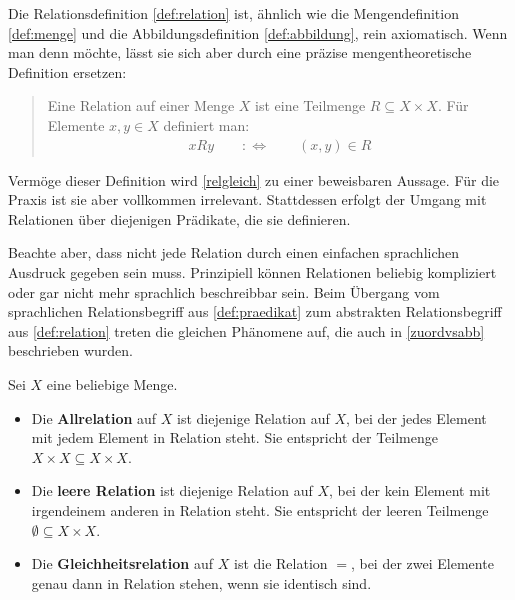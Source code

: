 \begin{vorschau}
    Die Relationsdefinition \cref{def:relation} ist, ähnlich wie die Mengendefinition \cref{def:menge} und die Abbildungsdefinition \cref{def:abbildung}, rein axiomatisch. Wenn man denn möchte, lässt sie sich aber durch eine präzise mengentheoretische Definition ersetzen:
    \begin{quote}
        Eine Relation auf einer Menge $X$ ist eine Teilmenge $R\subseteq X\times X$. Für Elemente $x,y\in X$ definiert man:
        \begin{align*}
            xRy\qquad:\Leftrightarrow\qquad (x,y) \in R
        \end{align*}
    \end{quote}
    Vermöge dieser Definition wird \cref{relgleich} zu einer beweisbaren Aussage. Für die Praxis ist sie aber vollkommen irrelevant. Stattdessen erfolgt der Umgang mit Relationen über diejenigen Prädikate, die sie definieren.
    
    Beachte aber, dass nicht jede Relation durch einen einfachen sprachlichen Ausdruck gegeben sein muss. Prinzipiell können Relationen beliebig kompliziert oder gar nicht mehr sprachlich beschreibbar sein. Beim Übergang vom sprachlichen Relationsbegriff aus \cref{def:praedikat} zum abstrakten Relationsbegriff aus \cref{def:relation} treten die gleichen Phänomene auf, die auch in \cref{zuordvsabb} beschrieben wurden.
\end{vorschau}


\begin{bsp} \label{def:universellerelationen}  
    Sei $X$ eine beliebige Menge.
    \begin{itemize}
        \item Die \textbf{Allrelation} auf $X$ ist diejenige Relation auf $X$, bei der jedes Element mit jedem Element in Relation steht. Sie entspricht der Teilmenge $X\times X\subseteq X\times X$.
        \item Die \textbf{leere Relation} ist diejenige Relation auf $X$, bei der kein Element mit irgendeinem anderen in Relation steht. Sie entspricht der leeren Teilmenge $\emptyset\subseteq X\times X$.
        \item Die \textbf{Gleichheitsrelation} auf $X$ ist die Relation $=$, bei der zwei Elemente genau dann in Relation stehen, wenn sie identisch sind.
    \end{itemize}
\end{bsp}


